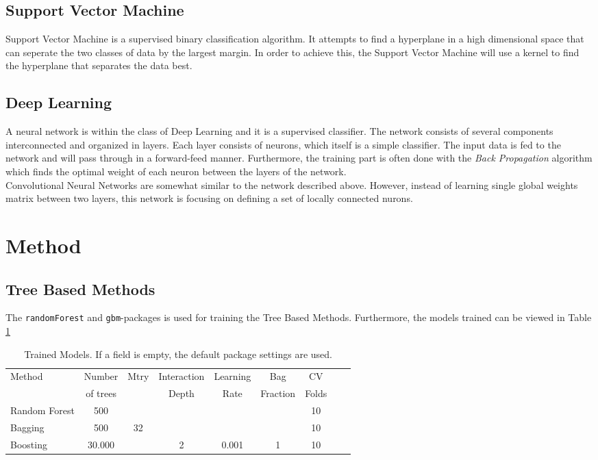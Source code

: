 \documentclass[a4paper,10pt]{article}
\begin{document}
\subsection{Support Vector Machine }
Support Vector Machine is a supervised binary classification algorithm. It
attempts to find a hyperplane in a high dimensional space that can seperate
the two classes of data by the largest margin. In order to achieve this, the
Support Vector Machine will use a kernel to find the hyperplane that separates
the data best. \\

\subsection{Deep Learning}
A neural network is within the class of Deep Learning and it is a supervised classifier. The network consists
of several components interconnected and organized in layers. Each layer
consists of neurons, which itself is a simple classifier. The input data
is fed to the network and will pass through in a forward-feed manner.
Furthermore, the training part is often done with the \textit{Back Propagation}
algorithm which finds the optimal weight of each neuron between
the layers of the network. \\

Convolutional Neural Networks are somewhat similar to the network
described above. However, instead of learning single global
weights matrix between two layers, this network is focusing on
defining a set of locally connected nurons.

\section{Method}
\subsection{Tree Based Methods}
The \texttt{randomForest} and \texttt{gbm}-packages is used for training
the Tree Based Methods. Furthermore,
the models trained can be viewed in Table {\ref{table:trained_trees}}\\

\begin{table}[H]
\centering
\begin{tabular}{l*{7}{c}r}
  Method              & Number & Mtry & Interaction & Learning & Bag & CV\\
                & of trees & & Depth & Rate & Fraction & Folds \\
                \hline
  Random Forest & 500 & & & &  & 10 \\
  Bagging & 500 & 32 & & & & 10 \\
  Boosting & 30.000 &  & 2 & 0.001 & 1 & 10 \\
\end{tabular}
\caption{Trained Models. If a field is empty, the default package settings are used.}
\label{table:trained_trees}
\end{table}
\end{document}
